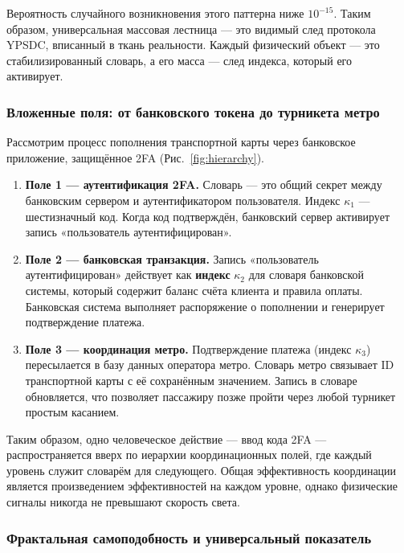 \documentclass[12pt,a4paper]{article}
\theoremstyle{remark}
\begin{document}
	Вероятность случайного возникновения этого паттерна ниже \(10^{-15}\). Таким образом, универсальная массовая лестница — это видимый след протокола YPSDC, вписанный в ткань реальности. Каждый физический объект — это стабилизированный словарь, а его масса — след индекса, который его активирует.
	
	\subsubsection{Вложенные поля: от банковского токена до турникета метро}
	
	Рассмотрим процесс пополнения транспортной карты через банковское приложение, защищённое 2FA (Рис.~\ref{fig:hierarchy}).
	
	\begin{enumerate}[leftmargin=*]
		\item \textbf{Поле 1 — аутентификация 2FA.}
		Словарь — это общий секрет между банковским сервером и аутентификатором пользователя. Индекс $\kappa_1$ — шестизначный код. Когда код подтверждён, банковский сервер активирует запись «пользователь аутентифицирован».
		
		\item \textbf{Поле 2 — банковская транзакция.}
		Запись «пользователь аутентифицирован» действует как \textbf{индекс} $\kappa_2$ для словаря банковской системы, который содержит баланс счёта клиента и правила оплаты. Банковская система выполняет распоряжение о пополнении и генерирует подтверждение платежа.
		
		\item \textbf{Поле 3 — координация метро.}
		Подтверждение платежа (индекс $\kappa_3$) пересылается в базу данных оператора метро. Словарь метро связывает ID транспортной карты с её сохранённым значением. Запись в словаре обновляется, что позволяет пассажиру позже пройти через любой турникет простым касанием.
	\end{enumerate}
	
	Таким образом, одно человеческое действие — ввод кода 2FA — распространяется вверх по иерархии координационных полей, где каждый уровень служит словарём для следующего. Общая эффективность координации является произведением эффективностей на каждом уровне, однако физические сигналы никогда не превышают скорость света.
	
	\subsubsection{Фрактальная самоподобность и универсальный показатель}
	
\end{document}
